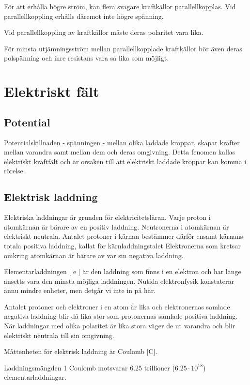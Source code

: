 \documentclass[a4paper,twoside,twocolumn,openright]{book}
\begin{document}
För att erhålla högre ström, kan flera svagare kraftkällor parallellkopplas. Vid
parallellkoppling erhålls däremot inte högre spänning.

Vid parallellkoppling av kraftkällor måste
deras polaritet vara lika.

För minsta utjämningsström mellan parallellkopplade kraftkällor bör även deras
polspänning och inre resistans vara så lika
som möjligt.

\cleardoublepage

\section{Elektriskt fält}

\subsection{Potential}

Potentialskillnaden - spänningen - mellan olika laddade kroppar, skapar krafter mellan
varandra samt mellan dem och deras omgivning. Detta fenomen kallas elektriskt kraftfält och är orsaken till att elektriskt laddade kroppar kan komma i rörelse.

\subsection{Elektrisk laddning}

Elektriska laddningar är grunden för elektricitetsläran. Varje proton i atomkärnan är
bärare av en positiv laddning. Neutronerna i atomkärnan är elektriskt neutrala. Antalet
protoner i kärnan bestämmer därför ensamt kärnans totala positiva laddning, kallat för
kärnladdningstalet Elektronerna som kretsar omkring atomkärnan är bärare av var sin
negativa laddning.

Elementarladdningen [ e ] är den laddning som finns i en elektron och har länge
ansetts vara den minsta möjliga laddningen. Nutida elektronfysik konstaterar ännu
mindre enheter, men detgår vi inte in på här.

Antalet protoner och elektroner i en atom är lika och elektronernas samlade negativa
laddning blir då lika stor som protonernas samlade positiva laddning. När laddningar med
olika polaritet är lika stora väger de ut varandra och blir elektriskt neutrala till sin
omgivning.

Måttenheten för elektrisk laddning är Coulomb [C].

Laddningsmängden 1 Coulomb motsvarar 6.25 trillioner ($6.25\cdot10^{18} $) elementarladdningar.
\end{document}
